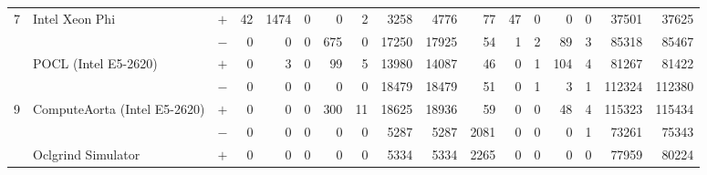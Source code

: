 \begin{tabular}{| lll | rrrrrrr | rrrrrrr |}
  \multirow{-2}{*}{7} & \multirow{-2}{*}{Intel Xeon Phi} & $+$ & 42 & 1474 & 0 & 0 & 2 & 3258 & 4776 & 77 & 47 & 0 & 0 & 0 & 37501 & 37625 \\
  \rowcolor{gray!25}
  & & $-$ & 0 & 0 & 0 & 675 & 0 & 17250 & 17925 & 54 & 1 & 2 & 89 & 3 & 85318 & 85467 \\
  \rowcolor{gray!25}
  \multirow{-2}{*}{8} & \multirow{-2}{*}{POCL (Intel E5-2620)} & $+$ & 0 & 3 & 0 & 99 & 5 & 13980 & 14087 & 46 & 0 & 1 & 104 & 4 & 81267 & 81422 \\
  & & $-$ & 0 & 0 & 0 & 0 & 0 & 18479 & 18479 & 51 & 0 & 1 & 3 & 1 & 112324 & 112380 \\
  \multirow{-2}{*}{9} & \multirow{-2}{*}{ComputeAorta (Intel E5-2620)} & $+$ & 0 & 0 & 0 & 300 & 11 & 18625 & 18936 & 59 & 0 & 0 & 48 & 4 & 115323 & 115434 \\
  \rowcolor{gray!25}
  & & $-$ & 0 & 0 & 0 & 0 & 0 & 5287 & 5287 & 2081 & 0 & 0 & 0 & 1 & 73261 & 75343 \\
  \rowcolor{gray!25}
  \multirow{-2}{*}{10} & \multirow{-2}{*}{Oclgrind Simulator} & $+$ & 0 & 0 & 0 & 0 & 0 & 5334 & 5334 & 2265 & 0 & 0 & 0 & 0 & 77959 & 80224 \\
  \hline
\end{tabular}

